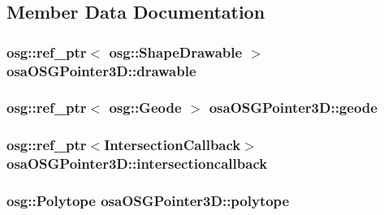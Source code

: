 \subsection{Member Data Documentation}
\hypertarget{classosa_o_s_g_pointer3_d_ab6c2c828a3e43d02bb12dac34b12cbbc}{
\subsubsection[{drawable}]{\setlength{\rightskip}{0pt plus 5cm}osg\-::ref\-\_\-ptr$<$ osg\-::\-Shape\-Drawable $>$ osa\-O\-S\-G\-Pointer3\-D\-::drawable\hspace{0.3cm}{\ttfamily [protected]}}}\label{classosa_o_s_g_pointer3_d_ab6c2c828a3e43d02bb12dac34b12cbbc}
\hypertarget{classosa_o_s_g_pointer3_d_af706c282ea0f7b14ae0b430a3b769510}{
\subsubsection[{geode}]{\setlength{\rightskip}{0pt plus 5cm}osg\-::ref\-\_\-ptr$<$ osg\-::\-Geode $>$ osa\-O\-S\-G\-Pointer3\-D\-::geode\hspace{0.3cm}{\ttfamily [protected]}}}\label{classosa_o_s_g_pointer3_d_af706c282ea0f7b14ae0b430a3b769510}
\hypertarget{classosa_o_s_g_pointer3_d_add1c2a935b2af684bf2cc3c180410a1c}{
\subsubsection[{intersectioncallback}]{\setlength{\rightskip}{0pt plus 5cm}osg\-::ref\-\_\-ptr$<${\bf Intersection\-Callback}$>$ osa\-O\-S\-G\-Pointer3\-D\-::intersectioncallback\hspace{0.3cm}{\ttfamily [protected]}}}\label{classosa_o_s_g_pointer3_d_add1c2a935b2af684bf2cc3c180410a1c}
\hypertarget{classosa_o_s_g_pointer3_d_a99d8f639a80c650298763ab6f28c711a}{
\subsubsection[{polytope}]{\setlength{\rightskip}{0pt plus 5cm}osg\-::\-Polytope osa\-O\-S\-G\-Pointer3\-D\-::polytope\hspace{0.3cm}{\ttfamily [protected]}}}\label{classosa_o_s_g_pointer3_d_a99d8f639a80c650298763ab6f28c711a}
